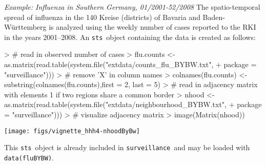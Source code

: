\documentclass[a4paper,11pt]{article}
\newcommand{\surveillance}{\texttt{surveillance}}
\newcommand{\code}[1]{\texttt{#1}}
\newcommand{\sts}{\texttt{sts}}
\newcommand{\example}[1]{\textit{Example: #1}}
\begin{document}
\example{Influenza in Southern Germany, 01/2001-52/2008}
The spatio-temporal spread of influenza in the 140 Kreise (districts) 
of Bavaria and Baden-W\"urttemberg  is analyzed using the weekly number of 
cases reported to the RKI~\citep{survstat-fluByBw} in the years 2001--2008.
An \sts\ object containing the data is created as follows:
\begin{Schunk}
\begin{Sinput}
> # read in observed number of cases
> flu.counts <- as.matrix(read.table(system.file("extdata/counts_flu_BYBW.txt", 
+                                       package = "surveillance")))
> # remove 'X' in column names                                      
> colnames(flu.counts) <- substring(colnames(flu.counts),first = 2, last = 5)                                      
> # read in adjacency matrix with elements 1 if two regions share a common border
> nhood <- as.matrix(read.table(system.file("extdata/neighbourhood_BYBW.txt",
+                                       package = "surveillance")))
> # visualize adjacency matrix
> image(Matrix(nhood))
\end{Sinput}
\end{Schunk}
\begin{center}
\vspace*{-2em}
\texttt{[image: figs/vignette\_hhh4-nhoodByBw]}
\end{center}
\begin{Schunk}
\end{Schunk}
This \sts\ object is already included in \surveillance\ and may be
loaded with \code{data(fluBYBW)}.
\end{document}
